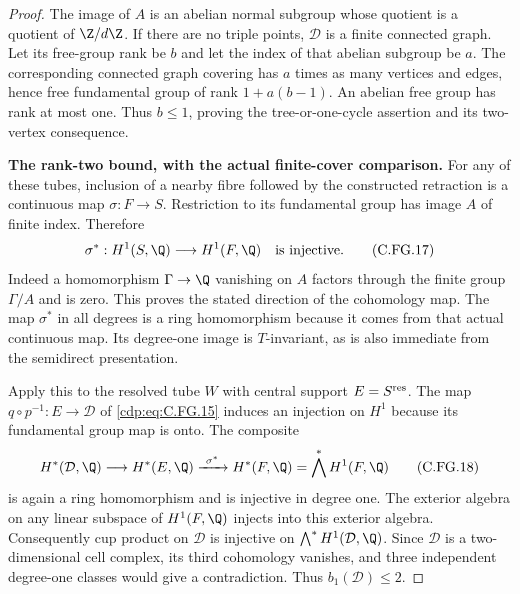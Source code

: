 \begin{proof}
The image of $A$ is an abelian normal subgroup whose quotient is
a quotient of $\Z/d\Z$. If there are no triple points,
$\mathcal D$ is a finite connected graph. Let its free-group rank
be $b$ and let the index of that abelian subgroup be $a$.
The corresponding connected graph covering has $a$ times as many
vertices and edges, hence free fundamental group of rank
$1+a(b-1)$. An abelian free group has rank at most one. Thus
$b\le1$, proving the tree-or-one-cycle assertion and its two-vertex
consequence.

\par\medskip\noindent\textbf{The rank-two bound, with the actual finite-cover comparison.}
For any of these tubes, inclusion of a nearby fibre followed by
the constructed retraction is a continuous map
$\sigma:F\to S$. Restriction to its fundamental group has image
$A$ of finite index. Therefore
\[
 \sigma^*:H^1(S,\Q)\longrightarrow H^1(F,\Q)
           \quad\hbox{is injective}.                  \tag{C.FG.17}\label{cdp:eq:C.FG.17}
\]
Indeed a homomorphism $\Gamma\to\Q$ vanishing on $A$ factors through
the finite group $\Gamma/A$ and is zero. This proves the stated
direction of the cohomology map. The map $\sigma^*$ in all degrees
is a ring homomorphism because it comes from that actual continuous
map. Its degree-one image is $T$-invariant, as is also immediate
from the semidirect presentation.

Apply this to the resolved tube $W$ with central support
$E=S^{\rm res}$. The map $q\circ p^{-1}:E\to\mathcal D$ of
\eqref{cdp:eq:C.FG.15} induces an injection on $H^1$ because its fundamental
group map is onto. The composite
\[
 H^*(\mathcal D,\Q)\longrightarrow H^*(E,\Q)
               \xrightarrow{\ \sigma^*\ }H^*(F,\Q)
                  =\bigwedge^*H^1(F,\Q)               \tag{C.FG.18}\label{cdp:eq:C.FG.18}
\]
is again a ring homomorphism and is injective in degree one.
The exterior algebra on any linear subspace of $H^1(F,\Q)$
injects into this exterior algebra. Consequently cup product
on $\mathcal D$ is injective on
$\bigwedge^*H^1(\mathcal D,\Q)$. Since $\mathcal D$ is a
two-dimensional cell complex, its third cohomology vanishes,
and three independent degree-one classes would give a
contradiction. Thus $b_1(\mathcal D)\le2$.


\end{proof}

